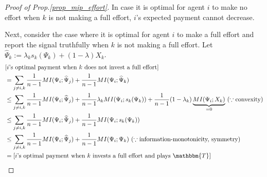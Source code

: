 \documentclass[11pt,a4paper,dvipdfmx]{article}
\theoremstyle{plain}
\renewcommand{\hat}{\widehat}
\newcommand{\1}{\mathbbm{1}}
\newcommand{\ocomment}[1]{{\textcolor{red}{#1}}}
\begin{document}
\begin{proof}[Proof of Prop.\ref{prop_mip_effort}]
	In case it is optimal for agent $i$ to make no effort when $k$ is not making a full effort, $i$'s expected payment cannot decrease.
	
	Next, consider the case where it is optimal for agent $i$ to make a full effort and report the signal truthfully when $k$ is not making a full effort. Let $\hat{\Psi}_k := \lambda_k s_k(\Psi_k) + (1 - \lambda) X_k$.
	\begin{align*}
		&\text{[$i$'s optimal payment when $k$ does not invest a full effort]} \\
		&= \sum_{j \neq i,k} \frac{1}{n-1} MI(\Psi_i; \hat{\Psi}_j) + \frac{1}{n-1} MI(\Psi_i; \hat{\Psi}_k) \\
		&\leq \sum_{j \neq i,k} \frac{1}{n-1} MI(\Psi_i; \hat{\Psi}_j) + \frac{1}{n-1} \lambda_k MI(\Psi_i; s_k(\Psi_k)) +
		\frac{1}{n-1} (1 - \lambda_k) \underbrace{
		MI(\Psi_i; X_k)
		}_{=0}  \ (\because \text{convexity})
		\\
		&\leq \sum_{j \neq i,k} \frac{1}{n-1} MI(\Psi_i; \hat{\Psi}_j) + \frac{1}{n-1} MI(\Psi_i; s_k(\Psi_k))\\
		&\leq \sum_{j \neq i,k} \frac{1}{n-1} MI(\Psi_i; \hat{\Psi}_j) + \frac{1}{n-1} MI(\Psi_i; \Psi_k) \ (\because \text{information-monotonicity, symmetry})\\
		&= \text{[$i$'s optimal payment when $k$ invests a full effort and plays $\mathbbm{T}$]}
	\end{align*}
\end{proof}
\end{document}
